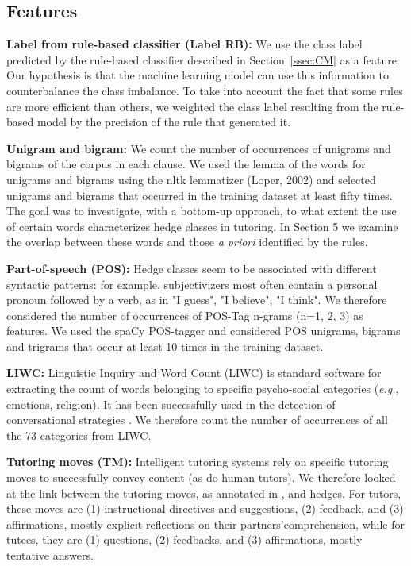 \documentclass[11pt]{article}
\begin{document}
\subsection{Features}

\noindent\textbf{Label from rule-based classifier (Label RB):} We use the class label predicted by the rule-based classifier described in Section~\ref{ssec:CM} as a feature. Our hypothesis is that the machine learning model can use this information to counterbalance the class imbalance. To take into account the fact that some rules are more efficient than others, we weighted the class label resulting from the rule-based model by the precision of the rule that generated it. 

\noindent\textbf{Unigram and bigram:} We count the number of occurrences of unigrams and bigrams of the corpus in each clause. We used the lemma of the words for unigrams and bigrams using the nltk lemmatizer (Loper, 2002) and selected unigrams and bigrams that occurred in the training dataset at least fifty times. The goal was to investigate, with a bottom-up approach, to what extent the use of certain words characterizes hedge classes in tutoring. In Section 5 we examine the overlap between these words and those \textit{a priori} identified by the rules.  

\noindent\textbf{Part-of-speech (POS):} Hedge classes seem to be associated with different syntactic patterns: for example, subjectivizers most often contain a personal pronoun followed by a verb, as in "I guess", "I believe", "I think". We therefore considered the number of occurrences of POS-Tag n-grams (n=1, 2, 3) as features. We used the spaCy POS-tagger and considered POS unigrams, bigrams and trigrams that occur at least 10 times in the training dataset.

\noindent\textbf{LIWC:} Linguistic Inquiry and Word Count (LIWC) \cite{Pennebaker2015} is standard software for extracting the count of words belonging to specific psycho-social categories (\textit{e.g.}, emotions, religion). It has been successfully used in the detection of conversational strategies \cite{Zhao2016}. We therefore count the number of occurrences of all the 73 categories from LIWC.

\noindent\textbf{Tutoring moves (TM):} Intelligent tutoring systems rely on specific tutoring moves to successfully convey content (as do human tutors). We therefore looked at the link between the tutoring moves, as annotated in \citet{Madaio2017}, and hedges. For tutors, these moves are (1) instructional directives and suggestions, (2) feedback, and (3) affirmations, mostly explicit reflections on their partners’comprehension, while for tutees, they are (1) questions, (2) feedbacks, and (3) affirmations, mostly tentative answers.
\end{document}
